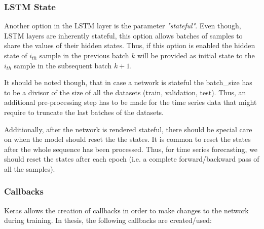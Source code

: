 \documentclass[a4paper, 12pt]{article}
\numberwithin{equation}{section}
\numberwithin{figure}{section}
\numberwithin{table}{section}
\begin{document}
	\subsubsection{LSTM State}
	
	Another option in the LSTM layer is the parameter \textit{"stateful"}. Even though, LSTM layers are inherently stateful, this option allows batches of samples to share the values of their hidden states. Thus, if this option is enabled the hidden state of $i_{th}$ sample in the previous batch $k$ will be provided as initial state to the $i_{th}$ sample in the subsequent batch $k+1$.\par
	
	It should be noted though, that in case a network is stateful the batch\_size has to be a divisor of the size of all the datasets (train, validation, test). Thus, an additional pre-processing step has to be made for the time series data that might require to truncate the last batches of the datasets.\par
	
	Additionally, after the network is rendered stateful, there should be special care on when the model should reset the the states. It is common to reset the states after the whole sequence has been processed. Thus, for time series forecasting, we should reset the states after each epoch (i.e. a complete forward/backward pass of all the samples).
	
	\newpage
	
	\subsubsection{Callbacks}
	
	Keras allows the creation of callbacks in order to make changes to the network during training.
	In thesis, the following callbacks are created/used:
	
\end{document}
